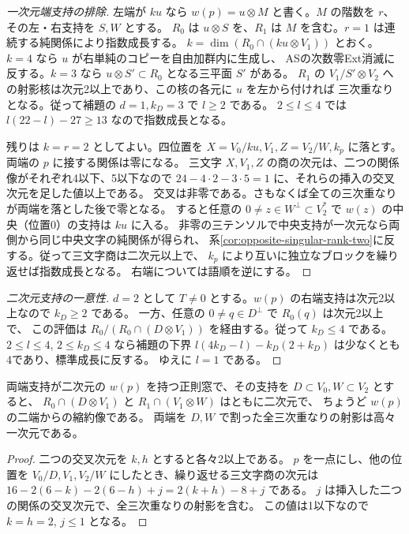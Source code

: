 \begin{proof}[一次元端支持の排除]
左端が $ku$ なら $w(p)=u\otimes M$ と書く。$M$ の階数を $r$、その左・右支持を $S,W$ とする。
$R_0$ は $u\otimes S$ を、$R_1$ は $M$ を含む。$r=1$ は連続する純関係により指数成長する。
$k=\dim(R_0\cap(ku\otimes V_1))$ とおく。$k=4$ なら $u$ が右単純のコピーを自由加群内に生成し、
ASの次数零Ext消滅に反する。$k=3$ なら $u\otimes S'\subset R_0$ となる三平面 $S'$ がある。
$R_1$ の $V_1/S'\otimes V_2$ への射影核は次元2以上であり、この核の各元に $u$ を左から付ければ
三次重なりとなる。従って補題の $d=1,k_D=3$ で $l\ge2$ である。
$2\le l\le4$ では $l(22-l)-27\ge13$ なので指数成長となる。

残りは $k=r=2$ としてよい。四位置を
$X=V_0/ku,V_1,Z=V_2/W,k_p$ に落とす。両端の $p$ に接する関係は零になる。
三文字 $X,V_1,Z$ の商の次元は、二つの関係像がそれぞれ4以下、5以下なので
$24-4\cdot2-3\cdot5=1$ に、それらの挿入の交叉次元を足した値以上である。
交叉は非零である。さもなくば全ての三次重なりが両端を落とした後で零となる。
すると任意の $0\ne z\in W^\perp\subset V_2^*$ で $w(z)$ の中央（位置0）の支持は $ku$ に入る。
非零の三テンソルで中央支持が一次元なら両側から同じ中央文字の純関係が得られ、
系\ref{cor:opposite-singular-rank-two}に反する。従って三文字商は二次元以上で、
$k_p$ により互いに独立なブロックを繰り返せば指数成長となる。
右端については語順を逆にする。
\end{proof}

\begin{proof}[二次元支持の一意性]
$d=2$ として $T\ne0$ とする。$w(p)$ の右端支持は次元2以上なので $k_D\ge2$ である。
一方、任意の $0\ne q\in D^\perp$ で $R_0(q)$ は次元2以上で、
この評価は $R_0/(R_0\cap(D\otimes V_1))$ を経由する。従って $k_D\le4$ である。
$2\le l\le4$, $2\le k_D\le4$ なら補題の下界
$l(4k_D-l)-k_D(2+k_D)$ は少なくとも4であり、標準成長に反する。
ゆえに $l=1$ である。
\end{proof}

\begin{corollary}\label{cor:endpoint-line-line-cut}
両端支持が二次元の $w(p)$ を持つ正則窓で、その支持を $D\subset V_0,W\subset V_2$ とすると、
$R_0\cap(D\otimes V_1)$ と $R_1\cap(V_1\otimes W)$ はともに二次元で、
ちょうど $w(p)$ の二端からの縮約像である。
両端を $D,W$ で割った全三次重なりの射影は高々一次元である。
\end{corollary}
\begin{proof}
二つの交叉次元を $k,h$ とすると各々2以上である。
$p$ を一点にし、他の位置を $V_0/D,V_1,V_2/W$ にしたとき、繰り返せる三文字商の次元は
$16-2(6-k)-2(6-h)+j=2(k+h)-8+j$ である。
$j$ は挿入した二つの関係の交叉次元で、全三次重なりの射影を含む。
この値は1以下なので $k=h=2$, $j\le1$ となる。
\end{proof}
